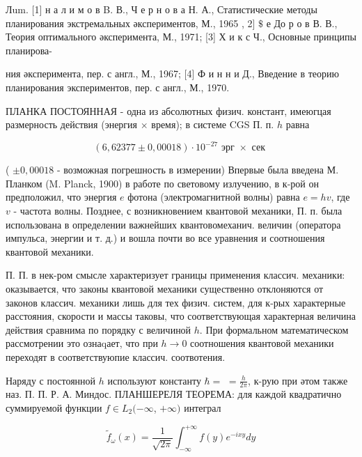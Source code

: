 \documentclass[10pt]{article}
\begin{document}
Лum. [1] н а л и м о в B. В., Ч е р н о в а Н. А., Статистические методы планирования экстремальных әкспериментов, М., 1965 , 2] $\$$ е До р о в В. В., Теория оптимального әксперимента, М., 1971; [3] Х и к с Ч., Основные принципы планирова-

ния әксперимента, пер. с англ., М., 1967; [4] Ф и н н и Д., Введение в теорию планирования экспериментов, пер. с англ., М., 1970.



ПЛАНКА ПОСТОЯННАЯ - одна из абсолютных физич. констант, имеюгцая размерность действия (энергия $\times$ время); в системе CGS П. п. $h$ равна



\[

(6,62377 \pm 0,00018) \cdot 10^{-27} \text { эрг } \times \text { сек }

\]



( $\pm 0,00018$ - возможная погрешность в измерении) Впервые была введена М. Планком (M. Planck, 1900) в работе по световому излучению, в к-рой он предположил, что энергия $e$ фотона (электромагнитной волны) равна $e=h v$, где $v$ - частота волны. Позднее, с возникновением квантовой механики, П. п. была использована в определении важнейших квантовомеханич. величин (оператора импульса, энергии и т. д.) и вошла почти во все уравнения и соотношения квантовой механики.



П. П. в нек-ром смысле характеризует границы применения классич. механики: оказывается, что законы квантовой механики существенно отклоняются от законов классич. механики лишь для тех физич. систем, для к-рых характерные расстояния, скорости и массы таковы, что соответствующая характерная величина действия сравнима по порядку с величиной $h$. При формальном математическом рассмотрении это ознаqает, что при $h \rightarrow 0$ соотношения квантовой механики переходят в соответствуюпие классич. соотвотения.



Наряду с постоянной $h$ используют константу $\hbar=$ $=\frac{h}{2 \pi}$, к-рую при әтом также наз. П. П. Р. А. Миндос. ПЛАНШЕРЕЛЯ ТЕОРЕМА: для каждой квадратично суммируемой функции $f \in L_{2}(-\infty$, $+\infty)$ интеграл



\[

\tilde{f}_{\omega}(x)=\frac{1}{\sqrt{2 \pi}} \int_{-\infty}^{+\infty} f(y) e^{-i x y} d y

\]
\end{document}

